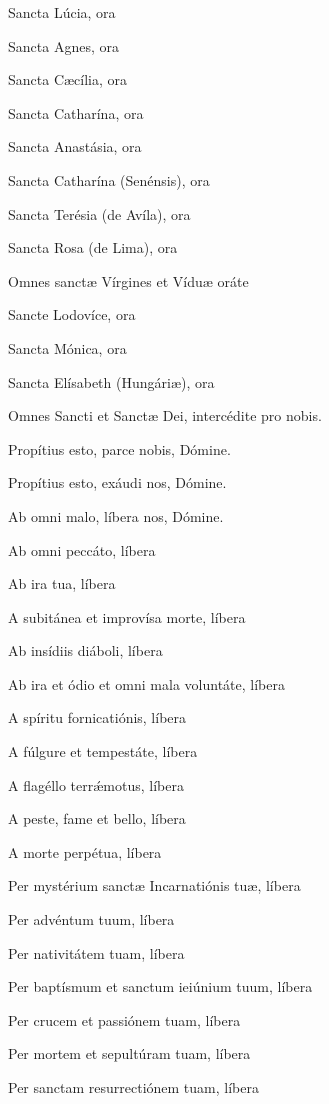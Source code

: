 \documentclass[12pt,a6paper]{book}
\begin{document}
\begin{sloppy}
Sancta Lúcia, ora

Sancta Agnes, ora

Sancta Cæcília, ora

Sancta Catharína, ora

Sancta Anastásia, ora

Sancta Catharína (Senénsis), ora

Sancta Terésia (de Avíla), ora

Sancta Rosa (de Lima), ora

Omnes sanctæ Vírgines et Víduæ oráte

\vspace{3mm}

Sancte Lodovíce, ora

Sancta Mónica, ora

Sancta Elísabeth (Hungáriæ), ora

Omnes Sancti et Sanctæ Dei, intercédite pro nobis.

\vspace{3mm}

Propítius esto, parce nobis, Dómine.

Propítius esto, exáudi nos, Dómine.

\vspace{3mm}

Ab omni malo, líbera nos, Dómine.

Ab omni peccáto, líbera

Ab ira tua, líbera

A subitánea et improvísa morte, líbera

Ab insídiis diáboli, líbera

Ab ira et ódio et omni mala voluntáte, líbera

A spíritu fornicatiónis, líbera

A fúlgure et tempestáte, líbera

A flagéllo terrǽmotus, líbera

A peste, fame et bello, líbera

A morte perpétua, líbera

Per mystérium sanctæ Incarnatiónis tuæ, líbera

Per advéntum tuum, líbera

Per nativitátem tuam, líbera

Per baptísmum et sanctum ieiúnium tuum, líbera

Per crucem et passiónem tuam, líbera

Per mortem et sepultúram tuam, líbera

Per sanctam resurrectiónem tuam, líbera


\end{sloppy}
\end{document}
